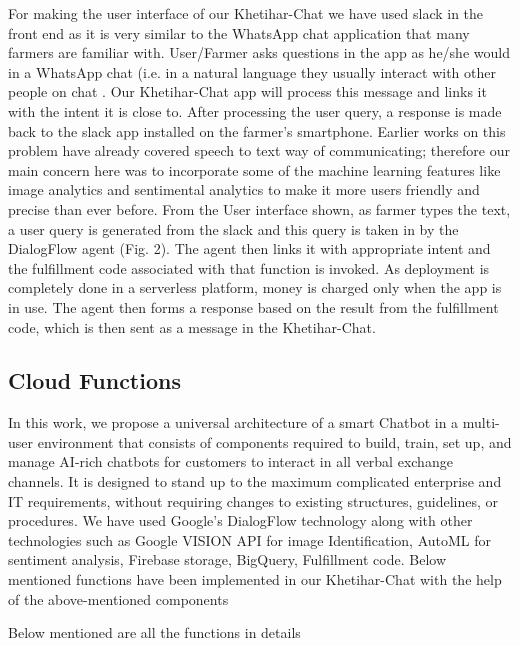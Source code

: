 \documentclass[10pt,conference]{IEEEtran}
\begin{document}
{\raggedright
For making the user interface of our Khetihar-Chat we have used slack in the front end as it is very similar to the WhatsApp chat application that many farmers are familiar with. User/Farmer asks questions in the app as he/she would in a WhatsApp chat (i.e. in a natural language they usually interact with other people on chat \cite{ahmady2020telegram}. Our Khetihar-Chat app will process this message and links it with the intent it is close to. After processing the user query, a response is made back to the slack app installed on the farmer’s smartphone. Earlier works on this problem have already covered speech to text way of communicating; therefore our main concern here was to incorporate some of the machine learning features like image analytics and sentimental analytics to make it more users friendly and precise than ever before.
\newline 
From the User interface shown, as farmer types the text, a user query is generated from the slack and this query is taken in by the DialogFlow agent (Fig. 2). The agent then links it with appropriate intent and the fulfillment code associated with that function is invoked. As deployment is completely done in a serverless platform, money is charged only when the app is in use. The agent then forms a response based on the result from the fulfillment code, which is then sent as a message in the Khetihar-Chat.\newline
\newline
}
\subsection{Cloud Functions}
{\raggedright
In this work, we propose a universal architecture of a smart Chatbot  in a multi-user environment that consists of components required to build, train, set up, and manage AI-rich chatbots for customers to interact in all verbal exchange channels. It is designed to stand up to the maximum complicated enterprise and IT requirements, without requiring changes to existing structures, guidelines, or procedures. We have used Google’s DialogFlow technology along with other technologies such as Google VISION API for image Identification, AutoML for sentiment analysis, Firebase storage, BigQuery, Fulfillment code. Below mentioned functions have been implemented in our Khetihar-Chat with the help of the above-mentioned components\newline\newline
}
{Below mentioned are all the functions in details\newline}
\end{document}
